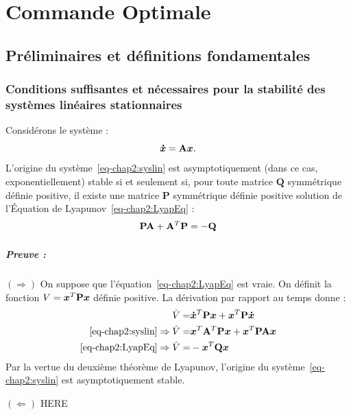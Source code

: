 \graphicspath{{Figures/}}
\chapter{Commande Optimale} \label{chap:adaptive gains}
\section{Préliminaires et définitions fondamentales}
\subsection{Conditions suffisantes et nécessaires pour la stabilité des systèmes linéaires stationnaires}\label{subsec-chap2:CNS stabilité syslin}
Considérons le système :
\begin{equation}\label{eq-chap2:syslin}
	\bm{\dot{x}} = \mathbf{A}\bm{x}.
\end{equation}
L'origine du système~\eqref{eq-chap2:syslin} est asymptotiquement (dans ce cas, exponentiellement) stable si et seulement si, pour toute matrice $\mathbf{Q}$ symmétrique définie positive, il existe une matrice $\mathbf{P}$ symmétrique définie positive solution de l'Équation de Lyapunov~\eqref{eq-chap2:LyapEq} : 
\begin{equation}\label{eq-chap2:LyapEq}
 	\mathbf{P}\mathbf{A} + \mathbf{A}^T\mathbf{P} = -\mathbf{Q}
\end{equation}
\paragraph{Preuve :} $(\Rightarrow)$ On suppose que l'équation~\eqref{eq-chap2:LyapEq} est vraie.  On définit la fonction $V=\bm{x}^T\mathbf{P}\bm{x}$ définie positive. La dérivation par rapport au temps donne : 
\begin{align}
	\begin{split}
		\dot{V} =& \bm{\dot{x}}^T\mathbf{P}\bm{x} + \bm{x}^T\mathbf{P}\bm{\dot{x}} \\
		\eqref{eq-chap2:syslin} \Rightarrow\dot{V} =& \bm{x}^T\mathbf{A}^T\mathbf{P}\bm{x} + \bm{x}^T\mathbf{P}\mathbf{A}\bm{x} \\
		\eqref{eq-chap2:LyapEq} \Rightarrow\dot{V} =& -\bm{x}^T\mathbf{Q}\bm{x} 
	\end{split}
\end{align}
Par la vertue du deuxième théorème de Lyapunov, l'origine du système~\eqref{eq-chap2:syslin} est asymptotiquement stable. 

$(\Leftarrow)$ {\color{red} HERE}
